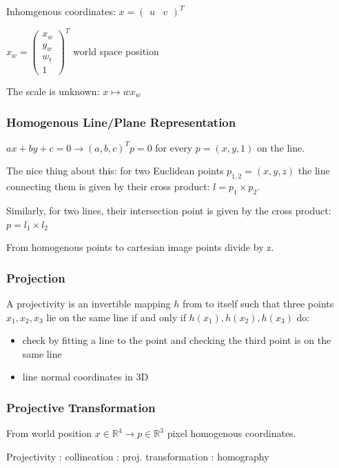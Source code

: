 Inhomgenous coordinates: $x = (\begin{matrix} u & v \end{matrix})^T $

$ x_w = \left( \begin{matrix} x_w \\  y_w \\ w_t\\  1 \end{matrix} \right)^T $ world space position

The scale is unknown: $x \mapsto  w x_w$

\subsubsection{Homogenous Line/Plane Representation}

$ax+by+c = 0 \to (a,b,c)^T p = 0$ for every $p = (x,y,1)$ on the line.

The nice thing about this: for two Euclidean points $p_{1,2} = (x,y,z) $ the line connecting them is given by their cross product: $l = p_1 \times p_2$. 

Similarly, for two lines, their intersection point is given by the cross product: 
$p = l_1 \times l_2$

From homogenous points to cartesian image points divide by z. 


\subsubsection{Projection}

A projectivity is an invertible mapping $h$ from  to itself such that three points $x_1 , x_2 , x_3$ lie on the same line if and only if $h(x_1), h(x_2 ), h(x_3)$ do:

\begin{itemize}
\item check by fitting a line to the point and checking the third point is on the same line
\item line normal coordinates in 3D
\end{itemize}

\subsubsection{Projective Transformation}

From world position $x \in \mathbb{R}^4 \to p \in \mathbb R^3$ pixel homogenous coordinates. 

Projectivity : collineation :  proj. transformation : homography

